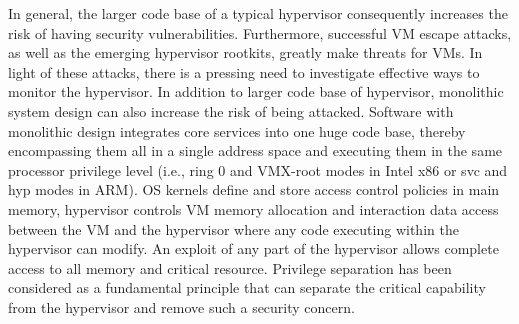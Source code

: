 \documentclass[conference]{IEEEtran}
\begin{document}
In general, the larger code base of a typical hypervisor consequently increases the risk of having security vulnerabilities.
Furthermore, successful VM escape attacks, as well as the emerging hypervisor rootkits, greatly make threats for VMs.
In light of these attacks, there is a pressing need to investigate effective ways to monitor the hypervisor. 
In addition to larger code base of hypervisor, monolithic system design can also increase the risk of being attacked.
Software with monolithic design integrates core services into one huge code base, thereby encompassing them all in a single address space and executing them in the same processor privilege level (i.e., ring 0 and VMX-root modes in Intel x86 or svc and hyp modes in ARM).
OS kernels define and store access control policies in main memory, hypervisor controls VM memory allocation and interaction data access between the VM and the hypervisor where any code executing within the hypervisor can modify.
An exploit of any part of the hypervisor allows complete access to all memory and critical resource. %
Privilege separation \cite{hilps} has been considered as a fundamental principle that can separate the critical capability from the hypervisor and remove such a security concern.
\end{document}
